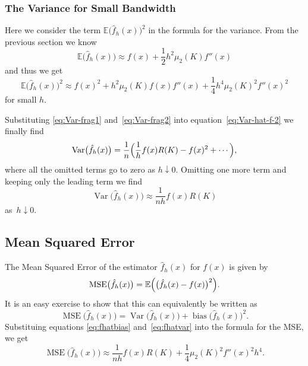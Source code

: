 \documentclass[
  a4paper,
]{article}
\theoremstyle{definition}
\theoremstyle{definition}
\theoremstyle{definition}
\theoremstyle{definition}
\theoremstyle{remark}
\begin{document}
\subsubsection{The Variance for Small Bandwidth}\label{the-variance-for-small-bandwidth}

Here we consider the term \(\mathbb{E}\bigl( \hat f_h(x) \bigr)^2\) in the formula
for the variance. From the previous section we know
\begin{equation*}
    \mathbb{E}\bigl( \hat f_h(x) \bigr)
    \approx f(x) + \frac12 h^2 \mu_2(K) f''(x)
\end{equation*}
and thus we get
\begin{equation}
    \mathbb{E}\bigl( \hat f_h(x) \bigr)^2
    \approx f(x)^2 + h^2 \mu_2(K) f(x) f''(x) + \frac14 h^4 \mu_2(K)^2 f''(x)^2
                             \label{eq:Var-frag2}
\end{equation}
for small \(h\).

Substituting \eqref{eq:Var-frag1} and~\eqref{eq:Var-frag2} into
equation~\eqref{eq:Var-hat-f-2} we finally find
\begin{equation*}
  \mathop{\mathrm{Var}}\bigl( \hat f_h(x) \bigr)
  = \frac{1}{n} \Bigl(
    \frac{1}{h} f(x) R(K)
    - f(x)^2
    + \cdots
   \Bigr),
\end{equation*}
where all the omitted terms go to zero as \(h \downarrow 0\).
Omitting one more term and keeping only the leading term
we find
\begin{equation}
  \mathop{\mathrm{Var}}\bigl( \hat f_h(x) \bigr)
  \approx \frac{1}{nh} f(x) R(K)     \label{eq:fhatvar}
\end{equation}
as~\(h\downarrow 0\).

\subsection{Mean Squared Error}\label{mean-squared-error}

The Mean Squared Error of the estimator \(\hat f_h(x)\) for \(f(x)\) is given
by
\begin{equation*}
  \mathop{\mathrm{MSE}}\nolimits\bigl( \hat f_h(x) \bigr)
  = \mathbb{E}\Bigl( \bigl( \hat f_h(x) - f(x) \bigr)^2 \Bigr).
\end{equation*}
It is an easy exercise to show that this can equivalently be written as
\begin{equation*}
  \mathop{\mathrm{MSE}}\nolimits\bigl( \hat f_h(x) \bigr)
  = \mathop{\mathrm{Var}}\bigl( \hat f_h(x) \bigr) + \mathop{\mathrm{bias}}\bigl( \hat f_h(x) \bigr)^2.
\end{equation*}
Substituing equations \eqref{eq:fhatbias} and~\eqref{eq:fhatvar} into
the formula for the MSE, we get
\begin{equation}
  \mathop{\mathrm{MSE}}\nolimits\bigl( \hat f_h(x) \bigr)
  \approx \frac{1}{nh} f(x) R(K) + \frac14 \mu_2(K)^2 f''(x)^2 h^4.
                           \label{eq:f-hat-MSE}
\end{equation}
\end{document}

